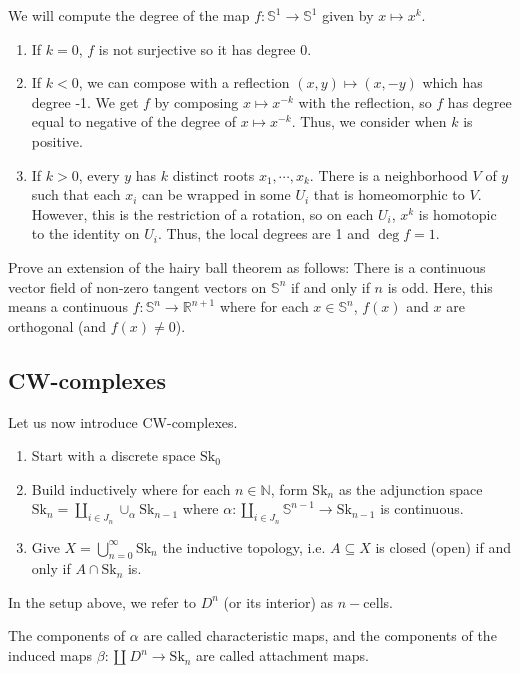 \documentclass[12pt,reqno]{amsart}
\numberwithin{theorem}{section}
\theoremstyle{definition}
\theoremstyle{remark}
\numberwithin{equation}{section}
\newcommand{\N}{\mathbb N}
\renewcommand{\S}{\mathbb S}
\theoremstyle{definition}
\newcommand{\R}{\mathbb{R}}
\newcommand{\Sk}{\mathrm{Sk}}
\begin{document}
\begin{example}
    We will compute the degree of the map $f:\S^1 \rightarrow \S^1$ given by $x \mapsto x^k$. 
    \begin{enumerate}
        \item If $k = 0$, $f$ is not surjective so it has degree 0.
        \item If $k < 0$, we can compose with a reflection $(x,y) \mapsto (x,-y)$ which has degree -1. We get $f$ by composing $x \mapsto x^{-k}$ with the reflection, so $f$ has degree equal to negative of the degree of $x \mapsto x^{-k}$. Thus, we consider when $k$ is positive.
        \item If $k > 0$, every $y$ has $k$ distinct roots $x_1,\cdots, x_k$. There is a neighborhood $V$ of $y$ such that each $x_i$ can be wrapped in some $U_i$ that is homeomorphic to $V$. However, this is the restriction of a rotation, so on each $U_i$, $x^k$ is homotopic to the identity on $U_i$.
        Thus, the local degrees are 1 and $\deg f = 1$.
    \end{enumerate}
\end{example}
\begin{exercise}
    Prove an extension of the hairy ball theorem as follows: There is a continuous vector field of non-zero tangent vectors on $\S^{n}$ if and only if $n$ is odd. Here, this means a continuous $f:\S^n \rightarrow \R^{n+1}$ where for each $x \in \S^n$, $f(x)$ and $x$ are orthogonal (and $f(x) \neq 0$).
\end{exercise}
\subsection{CW-complexes}
Let us now introduce CW-complexes.
\begin{enumerate}
    \item Start with a discrete space $\Sk_0 $
    \item Build inductively where for each $n \in \N$, form $\Sk_n$ as the adjunction space $\Sk_n =\coprod_{i \in J_n}\cup_\alpha \Sk_{n-1}$ where $\alpha: \coprod_{i \in J_n} \S^{n-1} \rightarrow \Sk_{n-1}$ is continuous. 
    \item Give $X=\bigcup_{n=0}^\infty \Sk_n$ the inductive topology, i.e. $A\subseteq X$ is closed (open) if and only if $A\cap \Sk_n$ is.
\end{enumerate}
In the setup above, we refer to $D^n$ (or its interior) as $n-$cells. 
\begin{definition}
    The components of $\alpha$ are called characteristic maps, and the components of the induced maps $\beta : \coprod_{} D^n \rightarrow \Sk_n$ are called attachment maps.
\end{definition}
\end{document}
